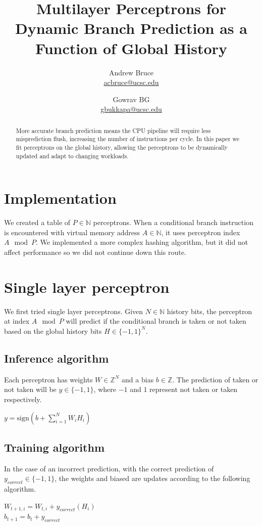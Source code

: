 \documentclass{article}
\title{Multilayer Perceptrons for Dynamic Branch Prediction as a Function of Global History}
\author{Andrew Bruce \\ \href{mailto:acbruce@ucsc.edu}{acbruce@ucsc.edu}
  \and Gowrav BG \\ \href{mailto:gbukkapa@ucsc.edu}{gbukkapa@ucsc.edu} }
\begin{document}
\maketitle

\begin{abstract}
  \indent More accurate branch prediction means the CPU pipeline will require less misprediction flush, increasing the number of instructions per cycle. In this paper we fit perceptrons on the global history, allowing the perceptrons to be dynamically updated and adapt to changing workloads.
\end{abstract}
\section{Implementation}
We created a table of $P \in \mathbb{N}$ perceptrons. When a conditional branch instruction is encountered with virtual memory address $A \in \mathbb{N}$, it uses perceptron index $A \mod P$. We implemented a more complex hashing algorithm, but it did not affect performance so we did not continue down this route.
\section*{Single layer perceptron}
We first tried single layer perceptrons. Given $N \in \mathbb{N}$ history bits, the perceptron at index $A \mod P$ will predict if the conditional branch is taken or not taken based on the global history bits $H \in \{ -1, 1 \}^N$.
\subsection*{Inference algorithm}
Each perceptron has weights $W \in \mathbb{Z}^N$ and a bias $b \in \mathbb{Z}$. The prediction of taken or not taken will be $y \in \{-1, 1\}$, where $-1$ and $1$ represent not taken or taken respectively.\\
\begin{center}
  $y = \text{sign}(b + \sum_{i=1}^N W_i H_i)$
\end{center}
\subsection*{Training algorithm}
In the case of an incorrect prediction, with the correct prediction of $y_{correct} \in \{-1, 1\}$, the weights and biased are updates according to the following algorithm\cite{article}.
\begin{center}
  $W_{t+1, i} = W_{t, i} + y_{correct}(H_i)$\\
  $b_{t+1} = b_t + y_{correct}$
\end{center}
\end{document}
